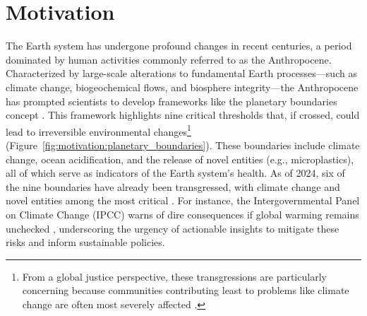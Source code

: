 

\ifpdf
    \graphicspath{{content/chapter1/figs/raster/}{content/chapter1/figs/pdf/}{content/chapter1/figs/}}
\else
    \graphicspath{{content/chapter1/figs/vector/}{content/chapter1/figs/}}
\fi



\chapter{Motivation}\label{chapter:motivation}

The Earth system has undergone profound changes in recent centuries, a period dominated by human activities commonly referred to as the Anthropocene. Characterized by large-scale alterations to fundamental Earth processes---such as climate change, biogeochemical flows, and biosphere integrity---the Anthropocene has prompted scientists to develop frameworks like the planetary boundaries concept \cite{rockstrom_safe_2009}. This framework highlights nine critical thresholds that, if crossed, could lead to irreversible environmental changes\footnote{From a global justice perspective, these transgressions are particularly concerning because communities contributing least to problems like climate change are often most severely affected \cite{rockstrom_safe_2023}.}  (Figure~\ref{fig:motivation:planetary_boundaries}). These boundaries include climate change, ocean acidification, and the release of novel entities (e.g., microplastics), all of which serve as indicators of the Earth system's health. As of 2024, six of the nine boundaries have already been transgressed, with climate change and novel entities among the most critical \cite{persson_outside_2022,richardson_earth_2023,rockstrom_planetary_2024}. For instance, the Intergovernmental Panel on Climate Change (IPCC) warns of dire consequences if global warming remains unchecked \cite{ipcc_impacts_2023}, underscoring the urgency of actionable insights to mitigate these risks and inform sustainable policies. 

